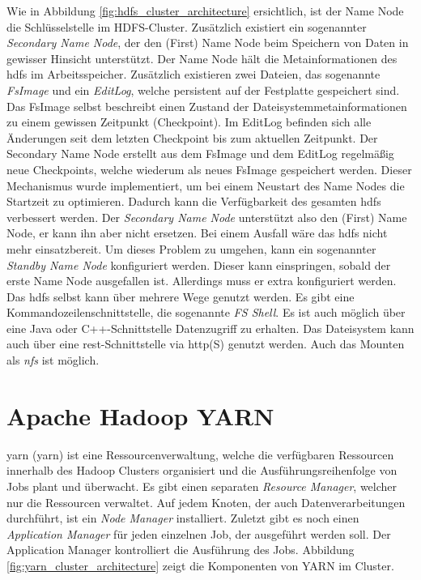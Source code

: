\noindent
Wie in Abbildung \ref{fig:hdfs_cluster_architecture} ersichtlich, ist der Name Node die Schlüsselstelle im HDFS-Cluster. Zusätzlich existiert ein sogenannter \textit{Secondary Name Node}, der den (First) Name Node beim Speichern von Daten in gewisser Hinsicht unterstützt. Der Name Node hält die Metainformationen des \gls{hdfs} im Arbeitsspeicher. Zusätzlich existieren zwei Dateien, das sogenannte \textit{FsImage} und ein \textit{EditLog}, welche persistent auf der Festplatte gespeichert sind. Das FsImage selbst beschreibt einen Zustand der Dateisystemmetainformationen zu einem gewissen Zeitpunkt (Checkpoint). Im EditLog befinden sich alle Änderungen seit dem letzten Checkpoint bis zum aktuellen Zeitpunkt. Der Secondary Name Node erstellt aus dem FsImage und dem EditLog regelmäßig neue Checkpoints, welche wiederum als neues FsImage gespeichert werden.
Dieser Mechanismus wurde implementiert, um bei einem Neustart des Name Nodes die Startzeit zu optimieren. Dadurch kann die Verfügbarkeit des gesamten \gls{hdfs}  verbessert werden. Der \textit{Secondary Name Node} unterstützt also den (First) Name Node, er kann ihn aber nicht ersetzen. Bei einem Ausfall wäre das \gls{hdfs} nicht mehr einsatzbereit. Um dieses Problem zu umgehen, kann ein sogenannter \textit{Standby Name Node} konfiguriert werden. Dieser kann einspringen, sobald der erste Name Node ausgefallen ist. Allerdings muss er extra konfiguriert werden.\cite[S. 40 ff.]{expert_hadoop_admin}\\

\noindent
Das \gls{hdfs} selbst kann über mehrere Wege genutzt werden. Es gibt eine Kommandozeilenschnittstelle, die sogenannte \textit{FS Shell}. Es ist auch möglich über eine Java oder C++-Schnittstelle Datenzugriff zu erhalten. Das Dateisystem kann auch über eine \gls{rest}-Schnittstelle via \gls{http}(S) genutzt werden. Auch das Mounten als \textit{\gls{nfs}} ist möglich.

\section{Apache Hadoop YARN}
\label{sec:theory_yarn}
\acrshort{yarn} (\acrlong{yarn}) ist eine Ressourcenverwaltung, welche die verfügbaren Ressourcen innerhalb des Hadoop Clusters organisiert und die Ausführungsreihenfolge von Jobs plant und überwacht. Es gibt einen separaten \textit{Resource Manager}, welcher nur die Ressourcen verwaltet. Auf jedem Knoten, der auch Datenverarbeitungen durchführt, ist ein \textit{Node Manager} installiert. Zuletzt gibt es noch einen \textit{Application Manager} für jeden einzelnen Job, der ausgeführt werden soll. Der Application Manager kontrolliert die Ausführung des Jobs.
Abbildung \ref{fig:yarn_cluster_architecture} zeigt die Komponenten von YARN im Cluster.\\

